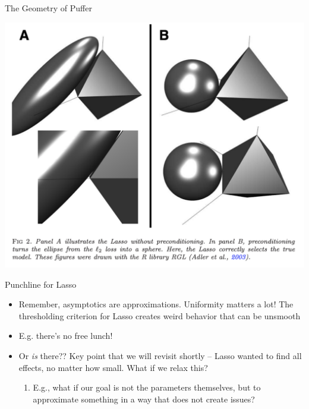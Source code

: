   \begin{frame}{The Geometry of Puffer}
  \begin{center}
    \includegraphics[width=0.65\linewidth]{puffer.png}
  \end{center}
  \end{frame}
  
  \begin{frame}[allowframebreaks]{Punchline for Lasso}
    \begin{itemize}
    \item Remember, asymptotics are approximations. Uniformity matters a
      lot! The thresholding criterion for Lasso creates weird behavior
      that can be unsmooth
    \item E.g. there's no free lunch!
    \item Or \emph{is} there?? Key point that we will revisit shortly --
      Lasso wanted to find all effects, no matter how small. What if we
      relax this?
      \begin{enumerate}[-]
      \item E.g., what if our goal is not the parameters themselves, but
        to approximate something in a way that does not create issues?
      \end{enumerate}
    \end{itemize}
  \end{frame}
  

